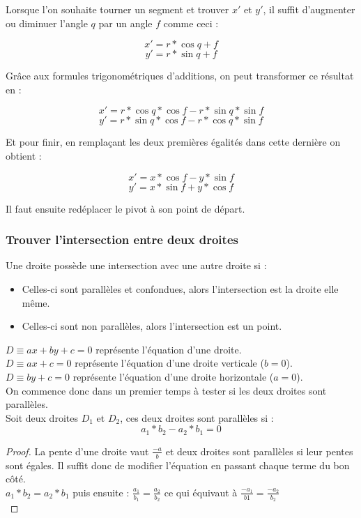 \documentclass[]{article}
\begin{document}
Lorsque l'on souhaite tourner un segment et trouver $ x' $ et $ y' $, 
il suffit d'augmenter ou diminuer l'angle $ q $ par un angle $ f $ comme ceci :

$$ x' = r * \cos{q + f} $$
$$ y' = r * \sin{q + f} $$

Grâce aux formules trigonométriques d'additions, on peut transformer ce résultat en :

$$ x' = r * \cos{q} * \cos{f} - r * \sin{q} * \sin{f} $$
$$ y' = r * \sin{q} * \cos{f} - r * \cos{q} * \sin{f} $$

Et pour finir, en remplaçant les deux premières égalités dans cette dernière on obtient : 

$$ x' = x * \cos{f} - y * \sin{f} $$
$$ y' = x * \sin{f} + y * \cos{f} $$

Il faut ensuite redéplacer le pivot à son point de départ.

\newpage
\subsubsection{\label{AnnexeIntersects}Trouver l'intersection entre deux droites}

Une droite possède une intersection avec une autre droite si :
\begin{itemize}
    \item Celles-ci sont parallèles et confondues, alors l'intersection est la droite elle même.
    \item Celles-ci sont non parallèles, alors l'intersection est un point. \\
\end{itemize} 

$ D \equiv ax + by + c = 0 $ représente l'équation d'une droite. \\
$ D \equiv ax + c = 0 $ représente l'équation d'une droite verticale ($b = 0$). \\
$ D \equiv by + c = 0 $ représente l'équation d'une droite horizontale ($a = 0$). \\

On commence donc dans un premier temps à tester si les deux droites sont parallèles. \\

Soit deux droites $D_1$ et $D_2$, ces deux droites sont parallèles si : 
$$ a_1 * b_2 - a_2 * b_1 = 0 $$

\begin{proof}
La pente d'une droite vaut $\frac{-a}{b}$ et deux droites sont parallèles
si leur pentes sont égales. Il suffit donc de modifier l'équation en passant chaque terme du bon côté. \\
$ a_1 * b_2 = a_2 * b_1 $ puis ensuite : $ \frac{a_1}{b_1} = \frac{a_2}{b_2} $ ce qui équivaut à
$ \frac{-a_1}{b1} = \frac{-a_2}{b_2} $ \\
\end{proof}
\end{document}

